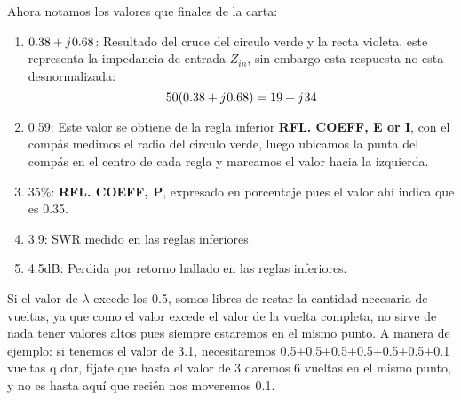 \documentclass[
	12pt, %
	fleqn, %
	a4paper, %
]{LegrandOrangeBook}
\begin{document}
\begin{example}
\begin{center}
\end{center}
Ahora notamos los valores que finales de la carta:
\begin{enumerate}
\item $0.38+{j\mkern1mu} 0.68$: Resultado del cruce del circulo verde y la recta violeta, este representa la impedancia de entrada $Z_{in}$, sin embargo esta respuesta no esta desnormalizada:
\begin{displaymath}
50(0.38+{j\mkern1mu} 0.68)=19+{j\mkern1mu} 34
\end{displaymath}
\item 0.59: Este valor se obtiene de la regla inferior \textbf{RFL. COEFF, E or I}, con el compás medimos el radio del circulo verde, luego ubicamos la punta del compás en el centro de cada regla y marcamos el valor hacia la izquierda.
\item 35\%: \textbf{RFL. COEFF, P}, expresado en porcentaje pues el valor ahí indica que es 0.35.
\item 3.9: SWR medido en las reglas inferiores
\item 4.5dB: Perdida por retorno hallado en las reglas inferiores.
\end{enumerate}
\end{example}
\begin{remark}
Si el valor de $\lambda$ excede los 0.5, somos libres de restar la cantidad necesaria de vueltas, ya que como el valor excede el valor de la vuelta completa, no sirve de nada tener valores altos pues siempre estaremos en el mismo punto. A manera de ejemplo: si tenemos el valor de 3.1, necesitaremos 0.5+0.5+0.5+0.5+0.5+0.5+0.1 vueltas q dar, fíjate que hasta el valor de 3 daremos 6 vueltas en el mismo punto, y no es hasta aquí que recién nos moveremos 0.1.
\end{remark}
\newpage
\end{document}
